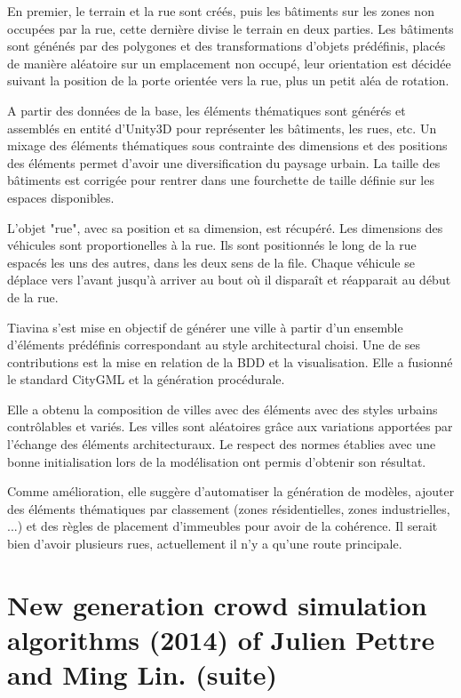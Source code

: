 \documentclass[11pt]{article}
\begin{document}
En premier, le terrain et la rue sont créés, puis les bâtiments sur les zones non occupées par la rue, cette dernière divise le terrain en deux parties. Les bâtiments sont génénés par des polygones et des transformations d'objets prédéfinis, placés de manière aléatoire sur un emplacement non occupé, leur orientation est décidée suivant la position de la porte orientée vers la rue, plus un petit aléa de rotation.

A partir des données de la base, les éléments thématiques sont générés et assemblés en entité d'Unity3D pour représenter les bâtiments, les rues, etc. Un mixage des éléments thématiques sous contrainte des dimensions et des positions des éléments permet d'avoir une diversification du paysage urbain. La taille des bâtiments est corrigée pour rentrer dans une fourchette de taille définie sur les espaces disponibles.

L'objet "rue", avec sa position et sa dimension, est récupéré. Les dimensions des véhicules sont proportionelles à la rue. Ils sont positionnés le long de la rue espacés les uns des autres, dans les deux sens de la file. Chaque véhicule se déplace vers l'avant jusqu'à arriver au bout où il disparaît et réapparait au début de la rue.

Tiavina s'est mise en objectif de générer une ville à partir d'un ensemble d'éléments prédéfinis correspondant au style architectural choisi. Une de ses contributions est la mise en relation de la BDD et la visualisation. Elle a fusionné le standard CityGML et la génération procédurale.

Elle a obtenu la composition de villes avec des éléments avec des styles urbains contrôlables et variés. Les villes sont aléatoires grâce aux variations apportées par l'échange des éléments architecturaux. Le respect des normes établies avec une bonne initialisation lors de la modélisation ont permis d'obtenir son résultat.

Comme amélioration, elle suggère d'automatiser la génération de modèles, ajouter des éléments thématiques par classement (zones résidentielles, zones industrielles, ...) et des règles de placement d'immeubles pour avoir de la cohérence. Il serait bien d'avoir plusieurs rues, actuellement il n'y a qu'une route principale.

\section{New generation crowd simulation algorithms (2014) of Julien Pettre and Ming Lin. (suite)}
\end{document}
